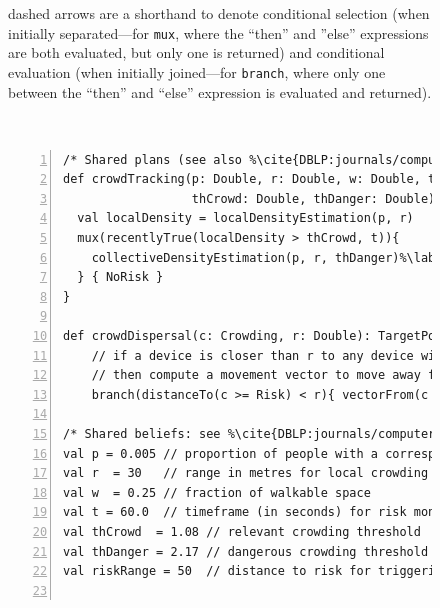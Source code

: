 \begin{figure}
\begin{minipage}{0.62\textwidth}
{{dashed arrows are a shorthand to denote conditional selection (when initially separated---for \lstinline|mux|, where the ``then'' and ''else'' expressions are both evaluated, but only one is returned) and conditional evaluation (when initially joined---for \lstinline|branch|, where only one between the ``then'' and  ``else'' expression is evaluated and returned).}
}
\end{minipage}\\[0.4cm]
\begin{minipage}{\textwidth}
\begin{lstlisting}[escapechar=\%,numbers=left]
/* Shared plans (see also %\cite{DBLP:journals/computer/BealPV15}%) */
def crowdTracking(p: Double, r: Double, w: Double, t: Double, %\label{line:crowdtrack}%
                  thCrowd: Double, thDanger: Double): Crowding = {
  val localDensity = localDensityEstimation(p, r)
  mux(recentlyTrue(localDensity > thCrowd, t)){
    collectiveDensityEstimation(p, r, thDanger)%\label{line:colldens}%
  } { NoRisk }
}

def crowdDispersal(c: Crowding, r: Double): TargetPosition = %\label{line:dispersal}%
    // if a device is closer than r to any device with crowding level = Risk or higher
    // then compute a movement vector to move away from the Overcrowded area, or do not move
    branch(distanceTo(c >= Risk) < r){ vectorFrom(c == Overcrowded) }{ currentPosition() }%\label{line:on-collective-intention}%

/* Shared beliefs: see %\cite{DBLP:journals/computer/BealPV15}% for motivation of the specific values */
val p = 0.005 // proportion of people with a corresponding device (agent)
val r  = 30   // range in metres for local crowding estimation
val w  = 0.25 // fraction of walkable space
val t = 60.0  // timeframe (in seconds) for risk monitoring
val thCrowd  = 1.08 // relevant crowding threshold
val thDanger = 2.17 // dangerous crowding threshold
val riskRange = 50  // distance to risk for triggering alert


\end{lstlisting}
\end{minipage}
\end{figure}
